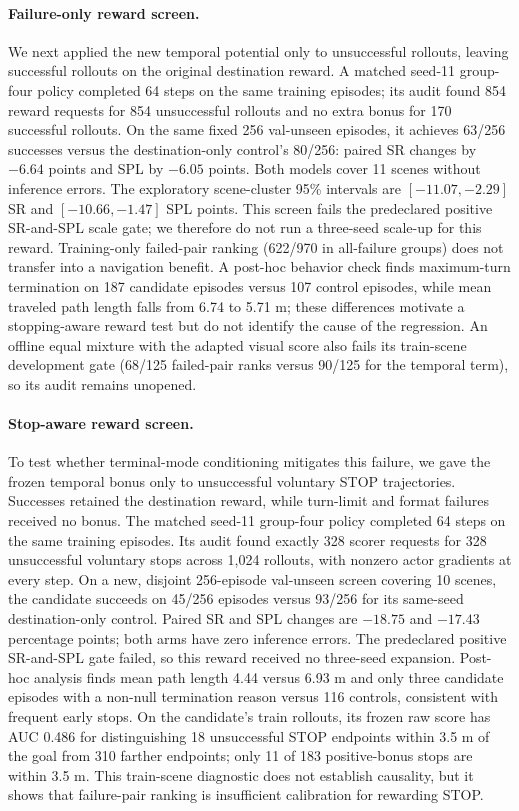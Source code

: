 \documentclass[10pt,twocolumn,letterpaper]{article}
\begin{document}
\paragraph{Failure-only reward screen.} We next applied the new temporal
potential only to unsuccessful rollouts, leaving successful rollouts on
the original destination reward. A matched seed-11 group-four policy
completed 64 steps on the same training episodes; its audit found 854
reward requests for 854 unsuccessful rollouts and no extra bonus for
170 successful rollouts. On the same fixed 256 val-unseen episodes, it
achieves 63/256 successes versus the destination-only control's 80/256:
paired SR changes by $-6.64$ points and SPL by $-6.05$ points. Both
models cover 11 scenes without inference errors. The exploratory
scene-cluster 95\% intervals are $[-11.07,-2.29]$ SR and
$[-10.66,-1.47]$ SPL points. This screen fails the predeclared positive
SR-and-SPL scale gate; we therefore do not run a three-seed scale-up for
this reward. Training-only failed-pair ranking (622/970 in all-failure
groups) does not transfer into a navigation benefit. A post-hoc behavior
check finds maximum-turn termination on 187 candidate episodes versus
107 control episodes, while mean traveled path length falls from 6.74
to 5.71 m; these differences motivate a stopping-aware reward test but
do not identify the cause of the regression. An offline equal mixture
with the adapted visual score also fails its train-scene development
gate (68/125 failed-pair ranks versus 90/125 for the temporal term), so
its audit remains unopened.

\paragraph{Stop-aware reward screen.} To test whether terminal-mode
conditioning mitigates this failure, we gave the frozen temporal bonus
only to unsuccessful voluntary STOP trajectories. Successes retained
the destination reward, while turn-limit and format failures received
no bonus. The matched seed-11 group-four policy completed 64 steps on
the same training episodes. Its audit found exactly 328 scorer requests
for 328 unsuccessful voluntary stops across 1,024 rollouts, with nonzero
actor gradients at every step. On a new, disjoint 256-episode val-unseen
screen covering 10 scenes, the candidate succeeds on 45/256 episodes
versus 93/256 for its same-seed destination-only control. Paired SR and
SPL changes are $-18.75$ and $-17.43$ percentage points; both arms have
zero inference errors. The predeclared positive SR-and-SPL gate failed,
so this reward received no three-seed expansion. Post-hoc analysis finds
mean path length 4.44 versus 6.93 m and only three candidate episodes
with a non-null termination reason versus 116 controls, consistent with
frequent early stops. On the candidate's train rollouts, its frozen raw
score has AUC 0.486 for distinguishing 18 unsuccessful STOP endpoints
within 3.5 m of the goal from 310 farther endpoints; only 11 of 183
positive-bonus stops are within 3.5 m. This train-scene diagnostic does
not establish causality, but it shows that failure-pair ranking is
insufficient calibration for rewarding STOP.
\end{document}
